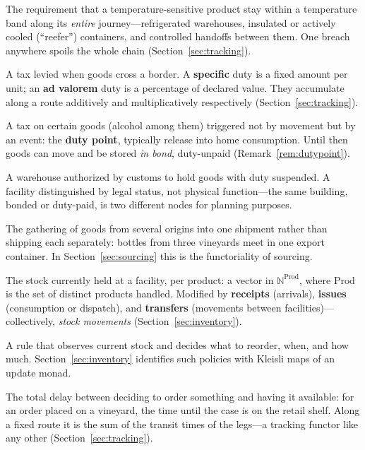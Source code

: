 \documentclass[11pt,a4paper]{article}
\newcommand{\Prod}{\mathrm{Prod}}
\theoremstyle{plain}
\theoremstyle{definition}
\theoremstyle{remark}
\begin{document}
\begin{description}[nosep]
\item[Cold chain.] The requirement that a temperature-sensitive
  product stay within a temperature band along its \emph{entire}
  journey---refrigerated warehouses, insulated or actively cooled
  (``reefer'') containers, and controlled handoffs between them. One
  breach anywhere spoils the whole chain
  (Section~\ref{sec:tracking}).

\item[Tariff / customs duty.] A tax levied when goods cross a border.
  A \textbf{specific} duty is a fixed amount per unit; an \textbf{ad
  valorem} duty is a percentage of declared value. They accumulate
  along a route additively and multiplicatively respectively
  (Section~\ref{sec:tracking}).

\item[Excise; duty point.] A tax on certain goods (alcohol among
  them) triggered not by movement but by an event: the \textbf{duty
  point}, typically release into home consumption. Until then goods
  can move and be stored \emph{in bond}, duty-unpaid
  (Remark~\ref{rem:dutypoint}).

\item[Bonded warehouse.] A warehouse authorized by customs to hold
  goods with duty suspended. A facility distinguished by legal
  status, not physical function---the same building, bonded or
  duty-paid, is two different nodes for planning purposes.

\item[Consolidation.] The gathering of goods from several origins
  into one shipment rather than shipping each separately: bottles
  from three vineyards meet in one export container. In
  Section~\ref{sec:sourcing} this is the functoriality of sourcing.

\item[Inventory.] The stock currently held at a facility, per
  product: a vector in $\mathbb{N}^{\Prod}$, where $\Prod$ is the
  set of distinct products handled. Modified by \textbf{receipts}
  (arrivals), \textbf{issues} (consumption or dispatch), and
  \textbf{transfers} (movements between facilities)---collectively,
  \emph{stock movements} (Section~\ref{sec:inventory}).

\item[Replenishment policy.] A rule that observes current stock and
  decides what to reorder, when, and how much. Section~\ref{sec:inventory} identifies
  such policies with Kleisli maps of an update monad.

\item[Lead time.] The total delay between deciding to order
  something and having it available: for an order placed on a
  vineyard, the time until the case is on the retail shelf. Along a
  fixed route it is the sum of the transit times of the legs---a
  tracking functor like any other (Section~\ref{sec:tracking}).


\end{description}
\end{document}
